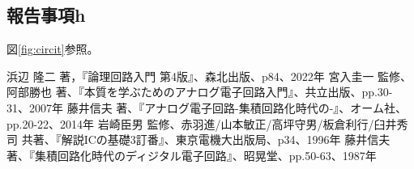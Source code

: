 \documentclass[a4paper,11pt,dvipdfmx]{jsarticle}
\begin{document}
\subsection{報告事項h}
図\ref{fig:circit}参照。

\begin{thebibliography}{99}
   浜辺 隆二 著，『論理回路入門 第4版』、森北出版、p84、2022年
   宮入圭一 監修、阿部勝也 著、『本質を学ぶためのアナログ電子回路入門』、共立出版、pp.30-31、2007年
   藤井信夫 著、『アナログ電子回路-集積回路化時代の-』、オーム社、pp.20-22、2014年
   岩崎臣男 監修、赤羽進/山本敏正/高坪守男/板倉利行/臼井秀司 共著、『解説ICの基礎3訂番』、東京電機大出版局、p34、1996年
   藤井信夫 著、『集積回路化時代のディジタル電子回路』、昭晃堂、pp.50-63、1987年
\end{thebibliography}
\end{document}
